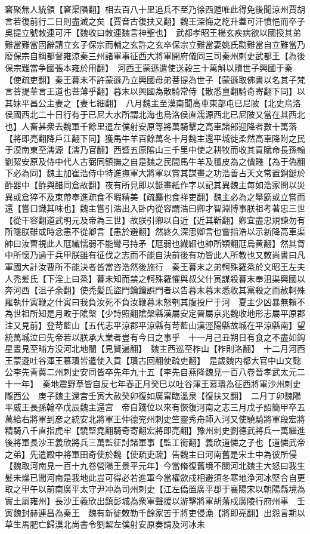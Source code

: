 窘聚無人統領【窘渠隕翻】相去百八十里追兵不至乃徐西遁唯此得免後聞涼州賈胡言若復前行二日則盡滅之矣【賈音古復扶又翻】魏王深悔之紇升蓋可汗憤悒而卒子吳提立號敇連可汗【魏收曰敇連魏言神聖也】　武都孝昭王楊玄疾病欲以國授其弟難當難當固辭請立玄子保宗而輔之玄許之玄卒保宗立難當妻姚氏勸難當自立難當乃廢保宗自稱都督雍涼秦三州諸軍事征西大將軍開府儀同三司秦州刺史武都王【為後保宗難當争國張本雍於用翻】　河西王蒙遜遣使送穀三十萬斛以贖世子興國于秦【使疏吏翻】秦王暮末不許蒙遜乃立興國母弟菩提為世子【蒙遜取佛書以名其子梵言菩提華言王道也菩薄乎翻】暮末以興國為散騎常侍【散悉亶翻騎奇寄翻下同】以其妹平昌公主妻之【妻七細翻】　八月魏主至漠南聞高車東部屯已尼陂【北史烏洛侯國西北二十日行有于已尼大水所謂北海也烏洛侯直濡源西北已尼陂又當在其西北也】人畜甚衆去魏軍千餘里遣左僕射安原等將萬騎擊之高車諸部迎降者數十萬落【將即亮翻降戶江翻下同】獲馬牛羊百餘萬冬十月魏主還平城徙柔然高車降附之民于漠南東至濡源【濡乃官翻】西暨五原隂山三千里中使之耕牧而收其貢賦命長孫翰劉絜安原及侍中代人古弼同鎮撫之自是魏之民間馬牛羊及氊皮為之價賤【為于偽翻下必為同】魏主加崔浩侍中特進撫軍大將軍以賞其謀畫之功浩善占天文常置銅鋌於酢器中【酢與醋同倉故翻】夜有所見即以鋌畫紙作字以記其異魏主每如浩家問以災異或倉猝不及束帶奉進疏食不暇精美【疏麤也食祥吏翻】魏主必為之舉筯或立嘗而還【嘗口識其味也】魏主嘗引浩出入卧内從容謂浩曰卿才智淵博事朕祖考著忠三世【從干容翻道武明元及帝為三世】故朕引卿以自近【近其靳翻】卿宜盡忠規諫勿有所隱朕雖或時忿恚不從卿言【恚於避翻】然終久深思卿言也嘗指浩以示新降高車渠帥曰汝曹視此人尫纎懦弱不能彎弓持矛【尫弱也纎細也帥所類翻尫烏黄翻】然其胷中所懷乃過于兵甲朕雖有征伐之志而不能自決前後有功皆此人所教也又敇尚書曰凡軍國大計汝曹所不能決者皆當咨浩然後施行　秦王暮末之弟軻殊羅烝於文昭王左夫人禿髪氏【下淫上曰烝】暮末知而禁之軻殊羅懼與叔父什寅謀殺暮末奉沮渠興國以奔河西【沮子余翻】使禿髪氏盜門鑰鑰誤門者以告暮末暮末悉收其黨殺之而赦軻殊羅執什寅鞭之什寅曰我負汝死不負汝鞭暮末怒刳其腹投尸于河　夏主少凶暴無賴不為世祖所知是月畋于隂槃【少詩照翻隂槃縣漢屬安定晉屬京兆魏收地形志屬平原郡注又見前】登苛藍山【五代志平涼郡平涼縣有苛藍山漢涇陽縣故城在平涼縣南】望統萬城泣曰先帝若以朕承大業者豈有今日之事乎　十一月己丑朔日有食之不盡如鈎星晝見至晡方没河北地闇【見賢遍翻】　魏主西巡至柞山【柞則洛翻】　十二月河西王蒙遜吐谷渾王慕璝皆遣使入貢【璝古回翻使疏吏翻】　是歲魏内都大官中山文懿公李先青冀二州刺史安同皆卒先年九十五【李先自燕降魏見一百八卷晉孝武太元二十一年】　秦地震野草皆自反七年春正月癸巳以吐谷渾王慕璝為征西將軍沙州刺史隴西公　庚子魏主還宫壬寅大赦癸卯復如廣甯臨溫泉【復扶又翻】　二月丁卯魏陽平威王長孫翰卒戊辰魏主還宫　帝自踐位以來有恢復河南之志三月戊子詔簡甲卒五萬給右將軍到彦之統安北將軍王仲德兖州刺史竺靈秀舟師入河又使驍騎將軍段宏將精騎八千直指虎牢【驍堅堯翻騎奇寄翻宏將即亮翻】豫州刺史劉德武將兵一萬繼進後將軍長沙王義欣將兵三萬監征討諸軍事【監工銜翻】義欣道憐之子也【道憐武帝之弟】先遣殿中將軍田奇使於魏【使疏吏疏】告魏主曰河南舊是宋土中為彼所侵【魏取河南見一百十九卷營陽王景平元年】今當脩復舊境不關河北魏主大怒曰我生髪未燥已聞河南是我地此豈可得必若進軍今當權歛戍相避須冬寒地浄河冰堅合自更取之甲午以前南廣平太守尹冲為司州刺史【江左僑置廣平郡于襄陽宋以朝陽縣境為實土屬雍州】長沙王義欣出鎮彭城為衆軍聲援以游擊將軍胡藩戍廣陵行府州事　壬寅魏封赫連昌為秦王　魏有新徙敇勒千餘家苦于將吏侵漁【將即亮翻】出怨言期以草生馬肥亡歸漠北尚書令劉絜左僕射安原奏請及河冰未